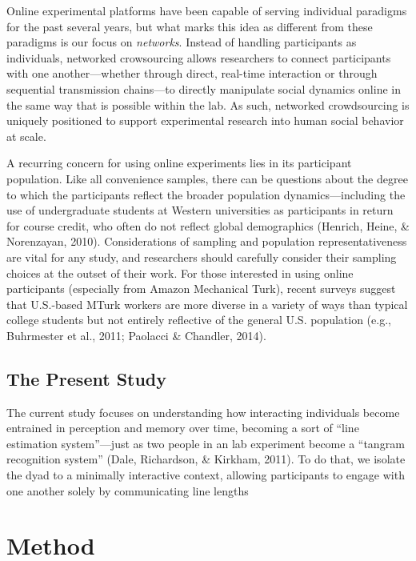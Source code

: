 \documentclass[10pt, letterpaper]{article}
\begin{document}
Online experimental platforms have been capable of serving individual
paradigms for the past several years, but what marks this idea as
different from these paradigms is our focus on \emph{networks}. Instead
of handling participants as individuals, networked crowsourcing allows
researchers to connect participants with one another---whether through
direct, real-time interaction or through sequential transmission
chains---to directly manipulate social dynamics online in the same way
that is possible within the lab. As such, networked crowdsourcing is
uniquely positioned to support experimental research into human social
behavior at scale.

A recurring concern for using online experiments lies in its participant
population. Like all convenience samples, there can be questions about
the degree to which the participants reflect the broader population
dynamics---including the use of undergraduate students at Western
universities as participants in return for course credit, who often do
not reflect global demographics (Henrich, Heine, \& Norenzayan, 2010).
Considerations of sampling and population representativeness are vital
for any study, and researchers should carefully consider their sampling
choices at the outset of their work. For those interested in using
online participants (especially from Amazon Mechanical Turk), recent
surveys suggest that U.S.-based MTurk workers are more diverse in a
variety of ways than typical college students but not entirely
reflective of the general U.S. population (e.g., Buhrmester et al.,
2011; Paolacci \& Chandler, 2014).

\subsection{The Present Study}\label{the-present-study}

The current study focuses on understanding how interacting individuals
become entrained in perception and memory over time, becoming a sort of
``line estimation system''---just as two people in an lab experiment
become a ``tangram recognition system'' (Dale, Richardson, \& Kirkham,
2011). To do that, we isolate the dyad to a minimally interactive
context, allowing participants to engage with one another solely by
communicating line lengths

\section{Method}\label{method}
\end{document}
